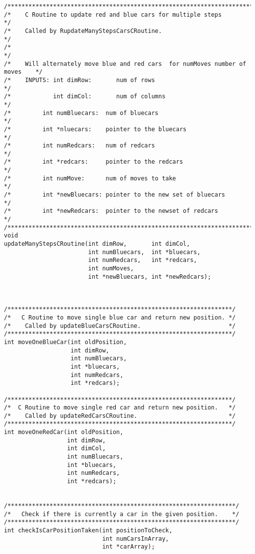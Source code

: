 \documentclass[11pt]{article}
\begin{document}
\begin{verbatim}
/*******************************************************************************/
/*    C Routine to update red and blue cars for multiple steps                 */
/*    Called by RupdateManyStepsCarsCRoutine.                                  */
/*                                                                             */
/*    Will alternately move blue and red cars  for numMoves number of moves    */
/*    INPUTS: int dimRow:       num of rows                                    */
/*            int dimCol:       num of columns                                 */
/*         int numBluecars:  num of bluecars                                   */
/*         int *nluecars:    pointer to the bluecars                           */
/*         int numRedcars:   num of redcars                                    */
/*         int *redcars:     pointer to the redcars                            */
/*         int numMove:      num of moves to take                              */
/*         int *newBluecars: pointer to the new set of bluecars                */
/*         int *newRedcars:  pointer to the newset of redcars                  */
/*******************************************************************************/
void
updateManyStepsCRoutine(int dimRow,       int dimCol,
                        int numBluecars,  int *bluecars,
                        int numRedcars,   int *redcars,
                        int numMoves,
                        int *newBluecars, int *newRedcars);



/****************************************************************/
/*   C Routine to move single blue car and return new position. */
/*    Called by updateBlueCarsCRoutine.                         */
/****************************************************************/
int moveOneBlueCar(int oldPosition,
                   int dimRow,
                   int numBluecars,
                   int *bluecars,
                   int numRedcars,
                   int *redcars);

/****************************************************************/
/*  C Routine to move single red car and return new position.   */
/*    Called by updateRedCarsCRoutine.                          */
/****************************************************************/
int moveOneRedCar(int oldPosition,
                  int dimRow,
                  int dimCol,
                  int numBluecars,
                  int *bluecars,
                  int numRedcars,
                  int *redcars);


/*****************************************************************/
/*   Check if there is currently a car in the given position.    */
/*****************************************************************/
int checkIsCarPositionTaken(int positionToCheck,
                            int numCarsInArray,
                            int *carArray);
\end{verbatim}
\end{document}
